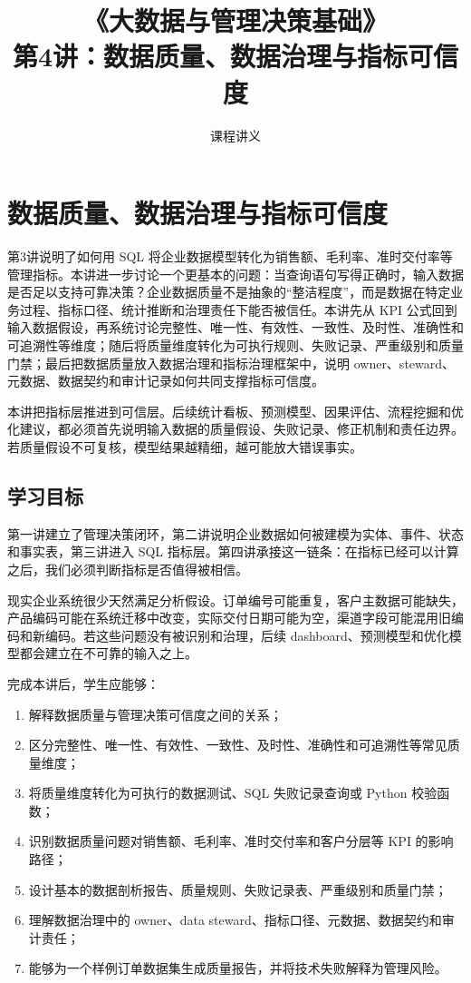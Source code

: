 \documentclass[UTF8,fontset=fandol,openany,zihao=-4]{ctexbook}
\title{《大数据与管理决策基础》\\[0.5em]\large 第4讲：数据质量、数据治理与指标可信度}
\author{课程讲义}
\date{}
\begin{document}
\maketitle
\tableofcontents

\setcounter{chapter}{3}
\chapter{数据质量、数据治理与指标可信度}
\label{ch:week04-data-quality}

\begin{chapterbox}
第3讲说明了如何用 SQL 将企业数据模型转化为销售额、毛利率、准时交付率等管理指标。本讲进一步讨论一个更基本的问题：当查询语句写得正确时，输入数据是否足以支持可靠决策？企业数据质量不是抽象的“整洁程度”，而是数据在特定业务过程、指标口径、统计推断和治理责任下能否被信任。本讲先从 KPI 公式回到输入数据假设，再系统讨论完整性、唯一性、有效性、一致性、及时性、准确性和可追溯性等维度；随后将质量维度转化为可执行规则、失败记录、严重级别和质量门禁；最后把数据质量放入数据治理和指标治理框架中，说明 owner、steward、元数据、数据契约和审计记录如何共同支撑指标可信度。
\end{chapterbox}

\begin{modernbox}[课程接口]
本讲把指标层推进到可信层。后续统计看板、预测模型、因果评估、流程挖掘和优化建议，都必须首先说明输入数据的质量假设、失败记录、修正机制和责任边界。若质量假设不可复核，模型结果越精细，越可能放大错误事实。
\end{modernbox}

\section{学习目标}

第一讲建立了管理决策闭环，第二讲说明企业数据如何被建模为实体、事件、状态和事实表，第三讲进入 SQL 指标层。第四讲承接这一链条：在指标已经可以计算之后，我们必须判断指标是否值得被相信。

现实企业系统很少天然满足分析假设。订单编号可能重复，客户主数据可能缺失，产品编码可能在系统迁移中改变，实际交付日期可能为空，渠道字段可能混用旧编码和新编码。若这些问题没有被识别和治理，后续 dashboard、预测模型和优化模型都会建立在不可靠的输入之上。

完成本讲后，学生应能够：
\begin{enumerate}
  \item 解释数据质量与管理决策可信度之间的关系；
  \item 区分完整性、唯一性、有效性、一致性、及时性、准确性和可追溯性等常见质量维度；
  \item 将质量维度转化为可执行的数据测试、SQL 失败记录查询或 Python 校验函数；
  \item 识别数据质量问题对销售额、毛利率、准时交付率和客户分层等 KPI 的影响路径；
  \item 设计基本的数据剖析报告、质量规则、失败记录表、严重级别和质量门禁；
  \item 理解数据治理中的 owner、data steward、指标口径、元数据、数据契约和审计责任；
  \item 能够为一个样例订单数据集生成质量报告，并将技术失败解释为管理风险。
\end{enumerate}
\end{document}
